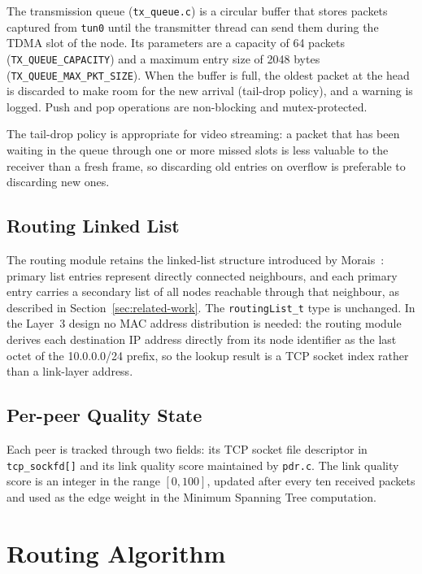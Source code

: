 The transmission queue (\texttt{tx\_queue.c}) is a circular buffer that stores packets captured
from \texttt{tun0} until the transmitter thread can send them during the TDMA slot of the node.
Its parameters are a capacity of 64 packets (\texttt{TX\_QUEUE\_CAPACITY}) and a maximum
entry size of 2048 bytes (\texttt{TX\_QUEUE\_MAX\_PKT\_SIZE}). When the buffer is full, the
oldest packet at the head is discarded to make room for the new arrival (tail-drop policy),
and a warning is logged. Push and pop operations are non-blocking and mutex-protected.

The tail-drop policy is appropriate for video streaming: a packet that has been waiting in
the queue through one or more missed slots is less valuable to the receiver than a fresh
frame, so discarding old entries on overflow is preferable to discarding new ones.

\subsection{Routing Linked List}

The routing module retains the linked-list structure introduced by
Morais~\cite{morais2024synchronization}: primary list entries represent directly connected
neighbours, and each primary entry carries a secondary list of all nodes reachable through
that neighbour, as described in Section~\ref{sec:related-work}. The \texttt{routingList\_t}
type is unchanged. In the Layer~3 design no MAC address distribution is needed: the routing module derives each
destination IP address directly from its node identifier as the last octet of the
10.0.0.0/24 prefix, so the lookup result is a TCP socket index rather than a link-layer
address.

\subsection{Per-peer Quality State}

Each peer is tracked through two fields: its TCP socket file descriptor in
\texttt{tcp\_sockfd[]} and its link quality score maintained by \texttt{pdr.c}. The link
quality score is an integer in the range $[0, 100]$, updated after every ten received packets
and used as the edge weight in the Minimum Spanning Tree computation.


\section{Routing Algorithm}
\label{sec:routing-algo}

